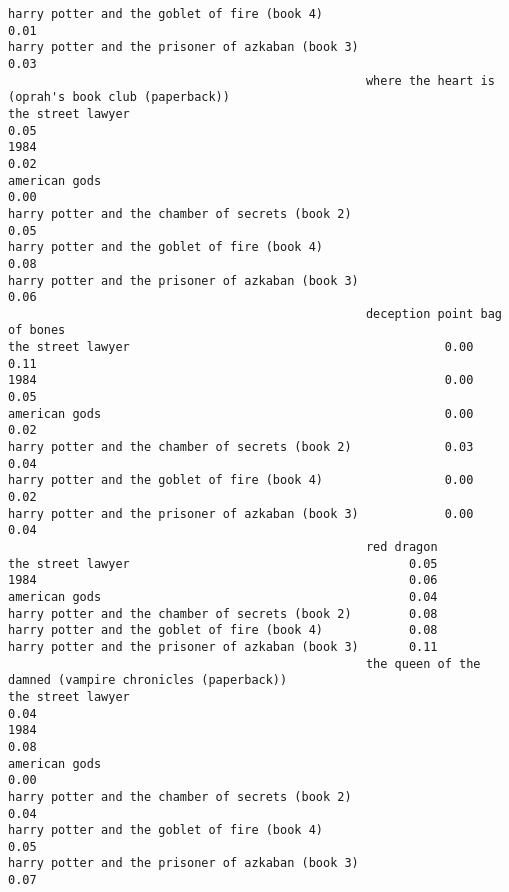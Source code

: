 \documentclass[
]{report}
\begin{document}
\begin{verbatim}
harry potter and the goblet of fire (book 4)                                         0.01
harry potter and the prisoner of azkaban (book 3)                                    0.03
                                                  where the heart is (oprah's book club (paperback))
the street lawyer                                                                               0.05
1984                                                                                            0.02
american gods                                                                                   0.00
harry potter and the chamber of secrets (book 2)                                                0.05
harry potter and the goblet of fire (book 4)                                                    0.08
harry potter and the prisoner of azkaban (book 3)                                               0.06
                                                  deception point bag of bones
the street lawyer                                            0.00         0.11
1984                                                         0.00         0.05
american gods                                                0.00         0.02
harry potter and the chamber of secrets (book 2)             0.03         0.04
harry potter and the goblet of fire (book 4)                 0.00         0.02
harry potter and the prisoner of azkaban (book 3)            0.00         0.04
                                                  red dragon
the street lawyer                                       0.05
1984                                                    0.06
american gods                                           0.04
harry potter and the chamber of secrets (book 2)        0.08
harry potter and the goblet of fire (book 4)            0.08
harry potter and the prisoner of azkaban (book 3)       0.11
                                                  the queen of the damned (vampire chronicles (paperback))
the street lawyer                                                                                     0.04
1984                                                                                                  0.08
american gods                                                                                         0.00
harry potter and the chamber of secrets (book 2)                                                      0.04
harry potter and the goblet of fire (book 4)                                                          0.05
harry potter and the prisoner of azkaban (book 3)                                                     0.07

\end{verbatim}
\end{document}
